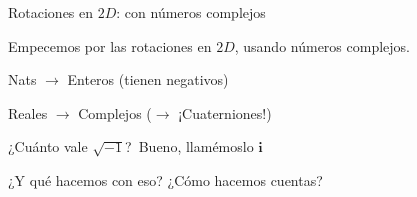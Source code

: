 \documentclass[10pt]{beamer}
\def\R{\mathbb{R}}
\def\ii{\textbf{i}}
\begin{document}
\begin{frame}{Rotaciones en $2D$: con números complejos}



Empecemos por las rotaciones en $2D$, usando números complejos. \bigskip

\pause

\small{Nats $\rightarrow$ Enteros (tienen negativos)}

Reales $\rightarrow$ Complejos ($\rightarrow$ ¡Cuaterniones!) \pause \bigskip

¿Cuánto vale $\sqrt{-1}$?\pause\ Bueno, llamémoslo $\ii$ \pause


¿Y qué hacemos con eso? ¿Cómo hacemos cuentas?









\end{frame}
\end{document}
